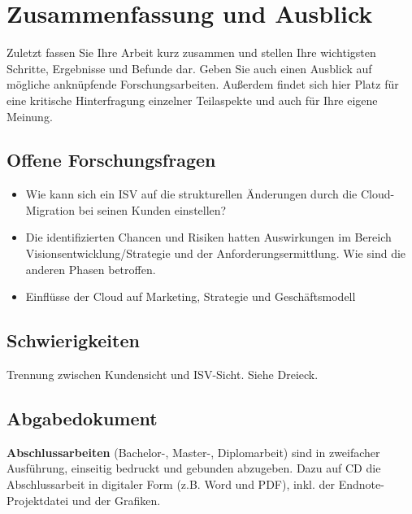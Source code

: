 \section{Zusammenfassung und Ausblick}
\label{cha:fazit}
Zuletzt fassen Sie Ihre Arbeit kurz zusammen und stellen Ihre wichtigsten Schritte, Ergebnisse und Befunde dar. Geben Sie auch einen Ausblick auf mögliche anknüpfende Forschungsarbeiten. Außerdem findet sich hier Platz für eine kritische Hinterfragung einzelner Teilaspekte und auch für Ihre eigene Meinung.

\subsection{Offene Forschungsfragen}
\begin{itemize}
	\item Wie kann sich ein ISV auf die strukturellen Änderungen durch die 
Cloud-Migration bei seinen Kunden einstellen?
	\item Die identifizierten Chancen und Risiken hatten Auswirkungen im 
Bereich Visionsentwicklung/Strategie und der Anforderungsermittlung. Wie sind 
die anderen Phasen betroffen.
	\item Einflüsse der Cloud auf Marketing, Strategie und Geschäftsmodell
\end{itemize}

\subsection{Schwierigkeiten}
Trennung zwischen Kundensicht und ISV-Sicht. Siehe Dreieck.




\subsection{Abgabedokument}
\textbf{Abschlussarbeiten} (Bachelor-, Master-, Diplomarbeit) sind in zweifacher 
Ausführung, einseitig bedruckt und gebunden abzugeben. Dazu auf CD die 
Abschlussarbeit in digitaler Form (z.B. Word und PDF), inkl. der 
Endnote-Projektdatei und der Grafiken. 
